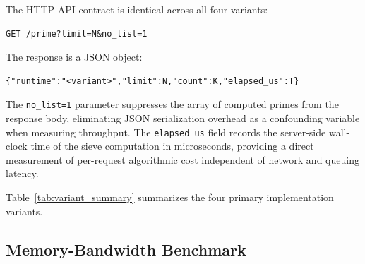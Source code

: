 The \acs{HTTP} \acs{API} contract is identical across all four variants:

\begin{verbatim}
GET /prime?limit=N&no_list=1
\end{verbatim}

The response is a \acs{JSON} object:
\begin{verbatim}
{"runtime":"<variant>","limit":N,"count":K,"elapsed_us":T}
\end{verbatim}

\begin{sloppypar}
The \texttt{no\_list=1} parameter suppresses the array of computed primes from the response body, eliminating \acs{JSON} serialization overhead as a confounding variable when measuring throughput. The \texttt{elapsed\_us} field records the server-side wall-clock time of the sieve computation in microseconds, providing a direct measurement of per-request algorithmic cost independent of network and queuing latency.
\end{sloppypar}

Table~\ref{tab:variant_summary} summarizes the four primary implementation variants.

\begin{table}[htbp]
    \centering
    \caption{Summary of the four primary benchmark variants}
    \label{tab:variant_summary}
\end{table}

\subsection{Memory-Bandwidth Benchmark}
\label{sec:memory_bandwidth_workload}

